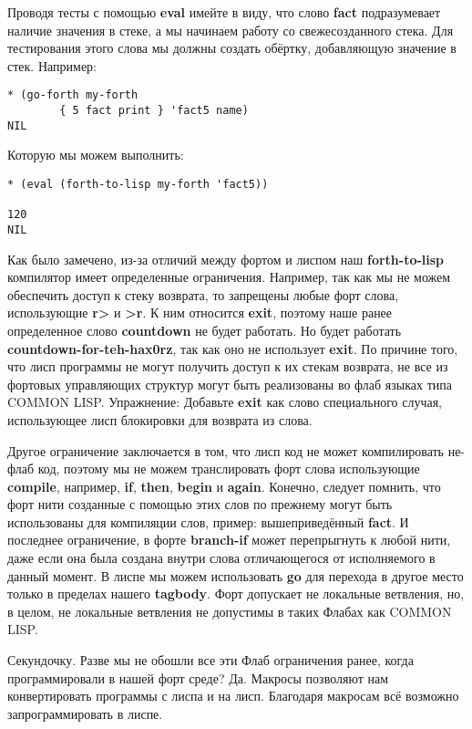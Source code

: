 Проводя тесты с помощью \textbf{eval} имейте в виду, что слово \textbf{fact} подразумевает наличие значения в стеке, а мы начинаем работу со свежесозданного стека. Для тестирования этого слова мы должны создать обёртку, добавляющую значение в стек. Например:

\begin{verbatim}
* (go-forth my-forth
	    { 5 fact print } 'fact5 name)
NIL
\end{verbatim}

Которую мы можем выполнить:

\begin{verbatim}
* (eval (forth-to-lisp my-forth 'fact5))

120 
NIL
\end{verbatim}

Как было замечено, из-за отличий между фортом и лиспом наш \textbf{forth-to-lisp} компилятор имеет определенные ограничения. Например, так как мы не можем обеспечить доступ к стеку возврата, то запрещены любые форт слова, использующие \textbf{r>} и \textbf{>r}. К ним относится \textbf{exit}, поэтому наше ранее определенное слово \textbf{countdown} не будет работать. Но будет работать \textbf{countdown-for-teh-hax0rz}, так как оно не использует \textbf{exit}. По причине того, что лисп программы не могут получить доступ к их стекам возврата, не все из фортовых управляющих структур могут быть реализованы во флаб языках типа COMMON LISP. Упражнение: Добавьте \textbf{exit} как слово специального случая, использующее лисп блокировки для возврата из слова.

Другое ограничение заключается в том, что лисп код не может компилировать не-флаб код, поэтому мы не можем транслировать форт слова использующие \textbf{compile}, например, \textbf{if}, \textbf{then}, \textbf{begin} и \textbf{again}. Конечно, следует помнить, что форт нити созданные с помощью этих слов по прежнему могут быть использованы для компиляции слов, пример: вышеприведённый \textbf{fact}. И последнее ограничение, в форте \textbf{branch-if} может перепрыгнуть к любой нити, даже если она была создана внутри слова отличающегося от исполняемого в данный момент. В лиспе мы можем использовать \textbf{go} для перехода в другое место только в пределах нашего \textbf{tagbody}. Форт допускает не локальные ветвления, но, в целом, не локальные ветвления не допустимы в таких Флабах как COMMON LISP.

Секундочку. Разве мы не обошли все эти Флаб ограничения ранее, когда программировали в нашей форт среде? Да. Макросы позволяют нам конвертировать программы с лиспа и на лисп. Благодаря макросам всё возможно запрограммировать в лиспе.
